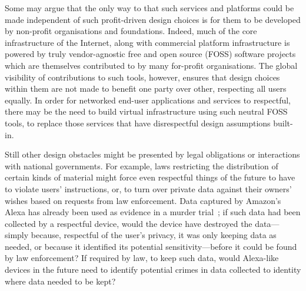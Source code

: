\documentclass{IETpaper}
\begin{document}
Some may argue that the only way to that such services and platforms could be made independent of such profit-driven design choices is for them to be developed by non-profit organisations and foundations.  Indeed, much of the core infrastructure of the Internet, along with commercial platform infrastructure is powered by truly vendor-agnostic free and open source (FOSS) software projects which are themselves contributed to by many for-profit organisations.  The global visibility of contributions to such tools, however, ensures that design choices within them are not made to benefit one party over other, respecting all users equally.  In order for networked end-user applications and services to respectful, there may be the need to build  virtual infrastructure using such neutral FOSS tools, to replace those services that have disrespectful design assumptions built-in.  %

Still other design obstacles might be presented by legal obligations or interactions with national governments.  For example, laws restricting the distribution of certain kinds of material might force even respectful things of the future to have to violate users' instructions, or, to turn over private data against their owners' wishes based on requests from law enforcement.  Data captured by Amazon's Alexa has already been used as evidence in a murder trial~\cite{alexamurder}; if such data had been collected by a respectful device, would the device have destroyed the data---simply because, respectful of the user's privacy, it was only keeping data as needed, or because it identified its potential sensitivity---before it could be found by law enforcement?  If required by law, to keep such data, would Alexa-like devices in the future need to identify potential crimes in data collected to identity where data needed to be kept?



\end{document}
